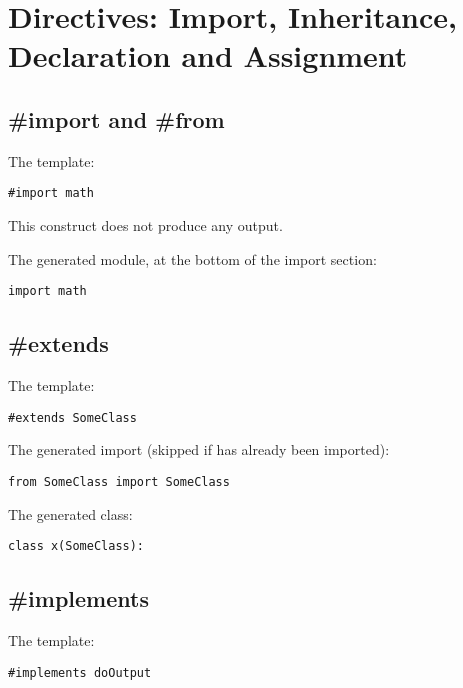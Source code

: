 \section{Directives: Import, Inheritance, Declaration and Assignment}
\label{inheritanceEtc}

\subsection{\#import and \#from}
\label{inheritanceEtc.import}

The template:
\begin{verbatim}
#import math
\end{verbatim}

This construct does not produce any output.

The generated module, at the bottom of the import section:
\begin{verbatim}
import math
\end{verbatim}


\subsection{\#extends}
\label{inheritanceEtc.extends}

The template:
\begin{verbatim}
#extends SomeClass
\end{verbatim}

The generated import (skipped if  has already been
imported):
\begin{verbatim}
from SomeClass import SomeClass
\end{verbatim}

The generated class:
\begin{verbatim}
class x(SomeClass):
\end{verbatim}

\subsection{\#implements}
\label{inheritanceEtc.implements}

The template:
\begin{verbatim}
#implements doOutput
\end{verbatim}

